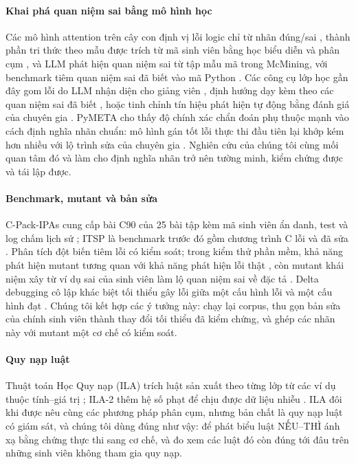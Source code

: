 \paragraph{Khai phá quan niệm sai bằng mô hình học}
Các mô hình attention trên cây con định vị lỗi logic chỉ từ nhãn đúng/sai \citep{hoq2025sann}, thành phần tri thức theo mẫu được trích từ mã sinh viên bằng học biểu diễn và phân cụm \citep{edm2026patternkc}, và LLM phát hiện quan niệm sai từ tập mẫu mã trong McMining, với benchmark tiêm quan niệm sai đã biết vào mã Python \citep{alhossami2026mcmining}. Các công cụ lớp học gần đây gom lỗi do LLM nhận diện cho giảng viên \citep{sigcse2026realtime}, định hướng dạy kèm theo các quan niệm sai đã biết \citep{sigcse2026tutor}, hoặc tinh chỉnh tín hiệu phát hiện tự động bằng đánh giá của chuyên gia \citep{aruleba2026ukicer}. PyMETA cho thấy độ chính xác chẩn đoán phụ thuộc mạnh vào cách định nghĩa nhãn chuẩn: mô hình gán tốt lỗi thực thi đầu tiên lại khớp kém hơn nhiều với lộ trình sửa của chuyên gia \citep{li2026pymeta}. Nghiên cứu của chúng tôi cùng mối quan tâm đó và làm cho định nghĩa nhãn trở nên tường minh, kiểm chứng được và tái lập được.

\paragraph{Benchmark, mutant và bản sửa}
C-Pack-IPAs cung cấp bài C90 của 25 bài tập kèm mã sinh viên ẩn danh, test và log chấm lịch sử \citep{orvalho2024cpack}; ITSP là benchmark trước đó gồm chương trình C lỗi và đã sửa \citep{yi2017itsp}. Phân tích đột biến tiêm lỗi có kiểm soát; trong kiểm thử phần mềm, khả năng phát hiện mutant tương quan với khả năng phát hiện lỗi thật \citep{just2014mutants}, còn mutant khái niệm xây từ ví dụ sai của sinh viên làm lộ quan niệm sai về đặc tả \citep{prasad2024conceptual}. Delta debugging cô lập khác biệt tối thiểu gây lỗi giữa một cấu hình lỗi và một cấu hình đạt \citep{zeller2002ddmin}. Chúng tôi kết hợp các ý tưởng này: chạy lại corpus, thu gọn bản sửa của chính sinh viên thành thay đổi tối thiểu đã kiểm chứng, và ghép các nhãn này với mutant một cơ chế có kiểm soát.

\paragraph{Quy nạp luật}
Thuật toán Học Quy nạp (ILA) trích luật sản xuất theo từng lớp từ các ví dụ thuộc tính--giá trị \citep{tolun1998ila}; ILA-2 thêm hệ số phạt để chịu được dữ liệu nhiễu \citep{tolun1999ila2}. ILA đôi khi được nêu cùng các phương pháp phân cụm, nhưng bản chất là quy nạp luật có giám sát, và chúng tôi dùng đúng như vậy: để phát biểu luật NẾU--THÌ ánh xạ bằng chứng thực thi sang cơ chế, và đo xem các luật đó còn đúng tới đâu trên những sinh viên không tham gia quy nạp.

